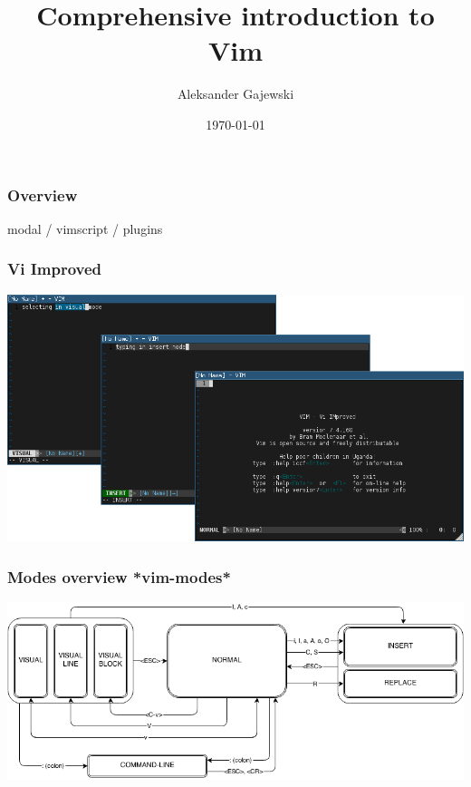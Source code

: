 \documentclass{beamer}
\title[Vim Intro]{Comprehensive introduction to Vim} %
\author{Aleksander Gajewski} %
\institute[None] %
{
None\\ %
\medskip
\textit{aleksander@gajewski.fr} %
}
\date{\today} %
\begin{document}

\begin{frame}
\titlepage %
\end{frame}

\begin{frame}
\frametitle{Overview} %
\tableofcontents %
\end{frame}

\begin{frame}
  modal / vimscript / plugins
\end{frame}

\begin{frame}[fragile]
\frametitle{Vi Improved}
 \includegraphics[width=\textwidth]{vim_screen.png}
\end{frame}

\begin{frame}[fragile]
  \frametitle{Modes overview *vim-modes*}
  \includegraphics[width=\textwidth]{vim_modes.png}
\end{frame}
\end{document}
